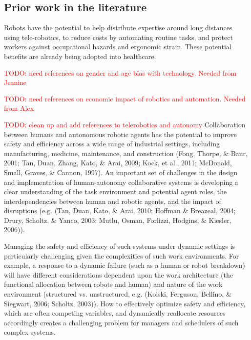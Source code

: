 \subsection{Prior work in the literature}


Robots have the potential to help distribute expertise around long distances using tele-robotics, to reduce costs by automating routine tasks, and protect workers against occupational hazards and ergonomic strain.  These potential benefits are already being adopted into healthcare.

\textcolor{red}{TODO: need references on gender and age bias with technology.  Needed from Jeanine}

\textcolor{red}{TODO: need references on economic impact of robotics and automation.  Needed from Alex}

\textcolor{red}{TODO: clean up and add references to telerobotics and autonomy}
Collaboration between humans and autonomous robotic agents has the potential to improve safety and efficiency across a wide range of industrial settings, including manufacturing, medicine, maintenance, and construction (Fong, Thorpe, \& Baur, 2001; Tan, Duan, Zhang, Kato, \& Arai, 2009; Kock, et al., 2011; McDonald, Small, Graves, \& Cannon, 1997). An important set of challenges in the design and implementation of human-autonomy collaborative systems is developing a clear understanding of the task environment and potential agent roles, the interdependencies between human and robotic agents, and the impact of disruptions (e.g. (Tan, Duan, Kato, \& Arai, 2010; Hoffman \& Breazeal, 2004; Drury, Scholtz, \& Yanco, 2003; Mutlu, Osman, Forlizzi, Hodgins, \& Kiesler, 2006)).

Managing the safety and efficiency of such systems under dynamic settings is particularly challenging given the complexities of such work environments. For example, a response to a dynamic failure (such as a human or robot breakdown) will have different considerations dependent upon the work architecture (the functional allocation between robots and human) and nature of the work environment (structured vs. unstructured, e.g. (Kolski, Ferguson, Bellino, \& Siegwart, 2006; Scholtz, 2003)). How to effectively optimize safety and efficiency, which are often competing variables, and dynamically reallocate resources accordingly creates a challenging problem for managers and schedulers of such complex systems.


